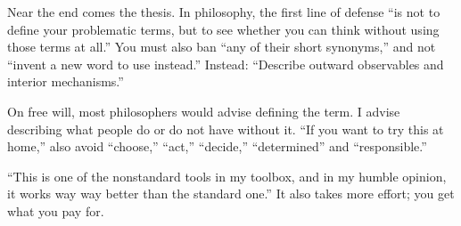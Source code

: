 Near the end comes the thesis. In philosophy, the first line of defense ``is not to define your problematic terms, but to see whether you can think without using those terms at all.'' You must also ban ``any of their short synonyms,'' and not ``invent a new word to use instead.'' Instead: ``Describe outward observables and interior mechanisms.''

On free will, most philosophers would advise defining the term. I advise describing what people do or do not have without it. ``If you want to try this at home,'' also avoid ``choose,'' ``act,'' ``decide,'' ``determined'' and ``responsible.'' 

``This is one of the nonstandard tools in my toolbox, and in my humble opinion, it works way way better than the standard one.'' It also takes more effort; you get what you pay for. 
